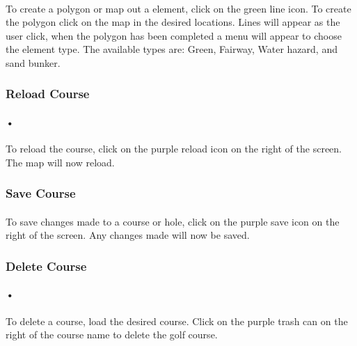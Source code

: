 \documentclass{article}
\begin{document}
    \paragraph{}
    To create a polygon or map out a element, click on the green line icon. To create the polygon click on the map in the desired locations. Lines will appear as the user click, when the polygon has been completed a menu will appear to choose the element type. The available types are: Green, Fairway, Water hazard, and sand bunker.
    
	\subsubsection{Reload Course}    
	\paragraph{•}
	To reload the course, click on the purple reload icon on the right of the screen. The map will now reload.
	
    
    \subsubsection{Save Course} 
    \paragraph{}
    To save changes made to a course or hole, click on the purple save icon on the right of the screen. Any changes made will now be saved.
    
    \subsubsection{Delete Course}
	\paragraph{•} 
	To delete a course, load the desired course. Click on the purple trash can on the right of the course name to delete the golf course.
\end{document}
